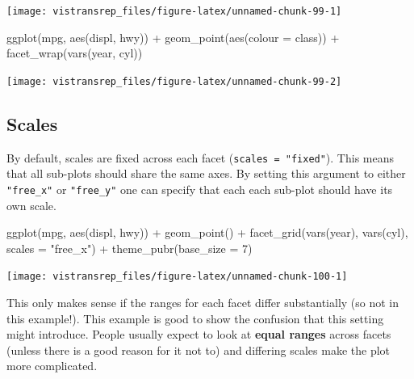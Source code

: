 \documentclass[]{book}
\newenvironment{Shaded}{}{}
\newcommand{\DataTypeTok}[1]{#1}
\newcommand{\DecValTok}[1]{#1}
\newcommand{\KeywordTok}[1]{\textcolor[rgb]{0.00,0.00,1.00}{#1}}
\newcommand{\NormalTok}[1]{#1}
\newcommand{\OperatorTok}[1]{#1}
\newcommand{\StringTok}[1]{\textcolor[rgb]{0.00,0.50,0.50}{#1}}
\begin{document}
\begin{flushright}\texttt{[image: vistransrep\_files/figure-latex/unnamed-chunk-99-1]} \end{flushright}

\begin{Shaded}
\begin{Highlighting}[]
\KeywordTok{ggplot}\NormalTok{(mpg, }\KeywordTok{aes}\NormalTok{(displ, hwy)) }\OperatorTok{+}
\StringTok{  }\KeywordTok{geom_point}\NormalTok{(}\KeywordTok{aes}\NormalTok{(}\DataTypeTok{colour =}\NormalTok{ class)) }\OperatorTok{+}
\StringTok{  }\KeywordTok{facet_wrap}\NormalTok{(}\KeywordTok{vars}\NormalTok{(year, cyl))}
\end{Highlighting}
\end{Shaded}

\begin{flushright}\texttt{[image: vistransrep\_files/figure-latex/unnamed-chunk-99-2]} \end{flushright}

\hypertarget{scales-1}{%
\subsection{Scales}\label{scales-1}}

By default, scales are fixed across each facet (\texttt{scales\ =\ "fixed"}).
This means that all sub-plots should share the same axes.
By setting this argument to either \texttt{"free\_x"} or \texttt{"free\_y"} one can specify that each each sub-plot should have its own scale.

\begin{Shaded}
\begin{Highlighting}[]
\KeywordTok{ggplot}\NormalTok{(mpg, }\KeywordTok{aes}\NormalTok{(displ, hwy)) }\OperatorTok{+}
\StringTok{  }\KeywordTok{geom_point}\NormalTok{() }\OperatorTok{+}
\StringTok{  }\KeywordTok{facet_grid}\NormalTok{(}\KeywordTok{vars}\NormalTok{(year), }\KeywordTok{vars}\NormalTok{(cyl), }\DataTypeTok{scales =} \StringTok{"free_x"}\NormalTok{) }\OperatorTok{+}
\StringTok{  }\KeywordTok{theme_pubr}\NormalTok{(}\DataTypeTok{base_size =} \DecValTok{7}\NormalTok{)}
\end{Highlighting}
\end{Shaded}

\begin{flushright}\texttt{[image: vistransrep\_files/figure-latex/unnamed-chunk-100-1]} \end{flushright}

This only makes sense if the ranges for each facet differ substantially (so not in this example!).
This example is good to show the confusion that this setting might introduce.
People usually expect to look at \textbf{equal ranges} across facets (unless there is a good reason for it not to) and differing scales make the plot more complicated.
\end{document}
